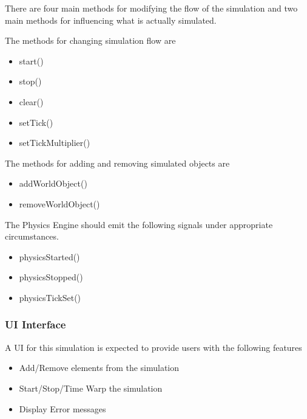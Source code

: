   There are four main methods for modifying the flow of the simulation and two main methods for influencing what is actually simulated.
  
  The methods for changing simulation flow are
  \begin{itemize}
  	\item start()
  	\item stop()
  	\item clear()
	\item setTick()
	\item setTickMultiplier()
  \end{itemize}
  
  The methods for adding and removing simulated objects are
  \begin{itemize}
  	\item addWorldObject()
  	\item removeWorldObject()
  \end{itemize}
  
  The Physics Engine should emit the following signals under appropriate circumstances.
  \begin{itemize}
  	\item physicsStarted()
  	\item physicsStopped()
  	\item physicsTickSet()
  \end{itemize}
  
  \subsubsection*{UI Interface}
  A UI for this simulation is expected to provide users with the following features
  \begin{itemize}
  	\item Add/Remove elements from the simulation
  	\item Start/Stop/Time Warp the simulation
  	\item Display Error messages
  \end{itemize}
  
